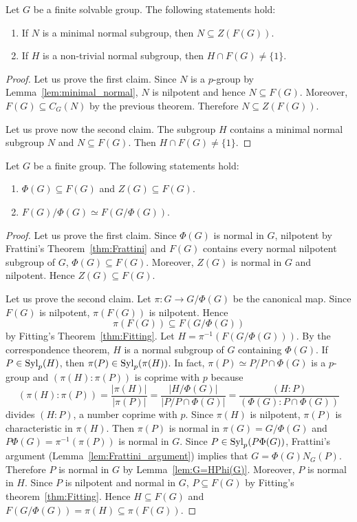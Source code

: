 \begin{corollary}
Let $G$ be a finite solvable group. The following statements hold: 
\begin{enumerate}
\item If $N$ is a minimal normal subgroup, then $N\subseteq Z(F(G))$. 
\item If $H$ is a non-trivial normal subgroup, then $H\cap F(G)\ne\{1\}$.
\end{enumerate}
\end{corollary}

\begin{proof}
Let us prove the first claim. Since $N$ is a $p$-group by Lemma~\ref{lem:minimal_normal}, 
$N$ is nilpotent and hence $N\subseteq F(G)$. Moreover, $F(G)\subseteq C_G(N)$ by the previous theorem. 
Therefore $N\subseteq Z(F(G))$. 

Let us prove now the second claim. The subgroup $H$ contains a minimal normal subgroup $N$ and 
$N\subseteq F(G)$. Then $H\cap F(G)\ne\{1\}$. 
\end{proof}

\begin{theorem}
Let $G$ be a finite group. The following statements hold:
\begin{enumerate}
\item $\Phi(G)\subseteq F(G)$ and $Z(G)\subseteq F(G)$.
\item $F(G)/\Phi(G)\simeq F(G/\Phi(G))$.
\end{enumerate}
\end{theorem}

\begin{proof}
Let us prove the first claim. Since $\Phi(G)$ is normal in $G$, nilpotent by 
Frattini's Theorem~\ref{thm:Frattini} and $F(G)$ contains every normal nilpotent subgroup of $G$, 
$\Phi(G)\subseteq F(G)$. Moreover, $Z(G)$ is normal in $G$ and nilpotent. Hence 
$Z(G)\subseteq F(G)$.

Let us prove the second claim. Let $\pi\colon G\to G/\Phi(G)$ be the canonical map. Since 
$F(G)$ is nilpotent, $\pi(F(G))$ is nilpotent. Hence 
\[
\pi(F(G))\subseteq F(G/\Phi(G))
\]
by Fitting's Theorem~\ref{thm:Fitting}. Let 
$H=\pi^{-1}(F(G/\Phi(G)))$. By the correspondence theorem, $H$ is a normal 
subgroup of $G$ containing $\Phi(G)$. If $P\in\mathrm{Syl}_p(H)$, then 
$\pi(P)\in\mathrm{Syl}_p(\pi(H))$. In fact, $\pi(P)\simeq P/P\cap \Phi(G)$ is a $p$-group and 
$(\pi(H):\pi(P))$ is coprime with $p$ because 
	\[
	(\pi(H):\pi(P))
	=\frac{|\pi(H)|}{|\pi(P)|}
	=\frac{|H/\Phi(G)|}{|P/P\cap \Phi(G)|}
	=\frac{(H:P)}{(\Phi(G):P\cap\Phi(G))}
	\]
divides $(H:P)$, a number coprime with $p$. Since $\pi(H)$ is nilpotent, 
$\pi(P)$ is characteristic in $\pi(H)$. Then $\pi(P)$ is normal
in $\pi(G)=G/\Phi(G)$ and $P\Phi(G)=\pi^{-1}(\pi(P))$ is normal 
in $G$. Since $P\in\mathrm{Syl}_p(P\Phi(G))$, Frattini's argument (Lemma~\ref{lem:Frattini_argument}) implies that 
$G=\Phi(G)N_G(P)$. Therefore $P$
is normal in $G$ by Lemma~\ref{lem:G=HPhi(G)}. Moreover, $P$ is normal in $H$. 
Since $P$ is nilpotent and normal in $G$, 
$P\subseteq F(G)$ by Fitting's theorem~\ref{thm:Fitting}. Hence 
$H\subseteq F(G)$ and 
$F(G/\Phi(G))=\pi(H)\subseteq \pi(F(G))$.
\end{proof}

